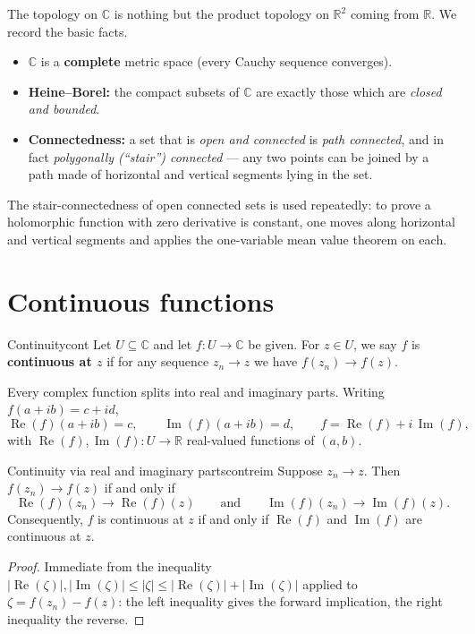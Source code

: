 \documentclass[11pt,openany]{report}
\newcommand{\C}{\mathbb{C}}
\newcommand{\R}{\mathbb{R}}
\renewcommand{\Re}{\operatorname{Re}}
\renewcommand{\Im}{\operatorname{Im}}
\newcommand{\abs}[1]{\left\lvert #1 \right\rvert}
\begin{document}
The topology on $\C$ is nothing but the product topology on $\R^2$ coming from $\R$.
We record the basic facts.

\begin{itemize}[leftmargin=1.4em]
  \item $\C$ is a \textbf{complete} metric space (every Cauchy sequence converges).
  \item \textbf{Heine--Borel:} the compact subsets of $\C$ are exactly those which are
        \emph{closed and bounded}.
  \item \textbf{Connectedness:} a set that is \emph{open and connected} is
        \emph{path connected}, and in fact \emph{polygonally (``stair'') connected} ---
        any two points can be joined by a path made of horizontal and vertical segments
        lying in the set.
\end{itemize}

\begin{remark}
The stair-connectedness of open connected sets is used repeatedly: to prove a holomorphic
function with zero derivative is constant, one moves along horizontal and vertical
segments and applies the one-variable mean value theorem on each.
\end{remark}

\section{Continuous functions}

\begin{definition}{Continuity}{cont}
Let $U\subseteq\C$ and let $f:U\to\C$ be given. For $z\in U$, we say $f$ is
\textbf{continuous at $z$} if for any sequence $z_n\to z$ we have $f(z_n)\to f(z)$.
\end{definition}

Every complex function splits into real and imaginary parts. Writing $f(a+ib)=c+id$,
\[
  \Re(f)(a+ib) = c, \qquad \Im(f)(a+ib) = d, \qquad f = \Re(f) + i\,\Im(f),
\]
with $\Re(f),\Im(f):U\to\R$ real-valued functions of $(a,b)$.

\begin{theorem}{Continuity via real and imaginary parts}{contreim}
Suppose $z_n\to z$. Then $f(z_n)\to f(z)$ if and only if
\[
  \Re(f)(z_n)\to\Re(f)(z) \qquad\text{and}\qquad \Im(f)(z_n)\to\Im(f)(z).
\]
Consequently, $f$ is continuous at $z$ if and only if $\Re(f)$ and $\Im(f)$ are continuous
at $z$.
\end{theorem}

\begin{proof}
Immediate from the inequality $\abs{\Re(\zeta)},\abs{\Im(\zeta)}\le\abs\zeta\le
\abs{\Re(\zeta)}+\abs{\Im(\zeta)}$ applied to $\zeta=f(z_n)-f(z)$: the left inequality
gives the forward implication, the right inequality the reverse.
\end{proof}
\end{document}
